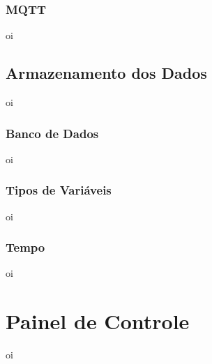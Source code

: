     	\begin{figure}[!h]
    	\end{figure}
        
        \subsubsection{MQTT}
        \label{sec:aquisicao-mqtt}
        oi

    \subsection{Armazenamento dos Dados}
    \label{sec:armazenamento-dados}
        oi
        
        \subsubsection{Banco de Dados}
        \label{sec:banco-dados}
        oi
        
        \subsubsection{Tipos de Variáveis}
        \label{sec:tipos-variaveis}
        oi
        
        \subsubsection{Tempo}
        \label{sec:tempo}
        oi
    
\section{Painel de Controle}
\label{sec:painel-controle}
oi
    
